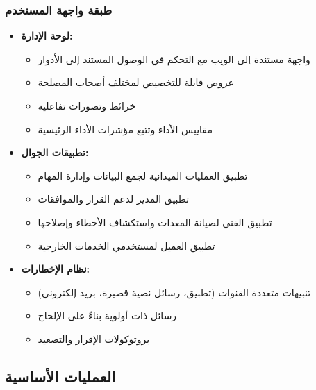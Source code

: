 \subsubsection{طبقة واجهة المستخدم}
\begin{itemize}
    \item \textbf{لوحة الإدارة:}
    \begin{itemize}
        \item واجهة مستندة إلى الويب مع التحكم في الوصول المستند إلى الأدوار
        \item عروض قابلة للتخصيص لمختلف أصحاب المصلحة
        \item خرائط وتصورات تفاعلية
        \item مقاييس الأداء وتتبع مؤشرات الأداء الرئيسية
    \end{itemize}
    
    \item \textbf{تطبيقات الجوال:}
    \begin{itemize}
        \item تطبيق العمليات الميدانية لجمع البيانات وإدارة المهام
        \item تطبيق المدير لدعم القرار والموافقات
        \item تطبيق الفني لصيانة المعدات واستكشاف الأخطاء وإصلاحها
        \item تطبيق العميل لمستخدمي الخدمات الخارجية
    \end{itemize}
    
    \item \textbf{نظام الإخطارات:}
    \begin{itemize}
        \item تنبيهات متعددة القنوات (تطبيق، رسائل نصية قصيرة، بريد إلكتروني)
        \item رسائل ذات أولوية بناءً على الإلحاح
        \item بروتوكولات الإقرار والتصعيد
    \end{itemize}
\end{itemize}

\subsection{العمليات الأساسية}

